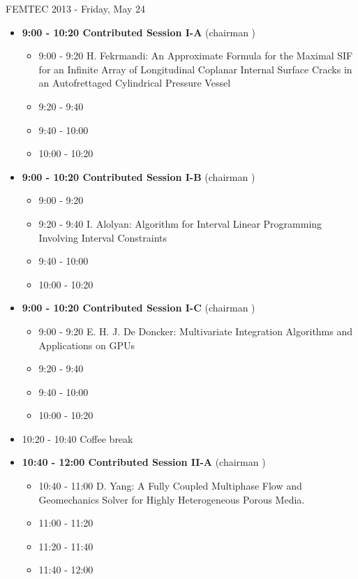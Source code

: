 \documentclass[10pt, A4]{article}%
\begin{document}
\centerline{\huge FEMTEC 2013 - Friday, May 24}
\vspace{4mm}
\begin{itemize}    
\item {\bf 9:00 - 10:20 Contributed Session I-A} (chairman ) 
  \begin{itemize}
    \item 9:00 - 9:20 {H. Fekrmandi}: {An Approximate Formula for the Maximal SIF for an Infinite Array of Longitudinal Coplanar Internal Surface Cracks in an Autofrettaged Cylindrical Pressure Vessel}
    \item 9:20 - 9:40 
    \item 9:40 - 10:00 
    \item 10:00 - 10:20  
  \end{itemize}
  \item {\bf 9:00 - 10:20 Contributed Session I-B} (chairman ) 
  \begin{itemize}
    \item 9:00 - 9:20 
    \item 9:20 - 9:40 {I. Alolyan}: {Algorithm for Interval Linear  Programming Involving Interval Constraints}
    \item 9:40 - 10:00 
    \item 10:00 - 10:20      
  \end{itemize}
    \item {\bf 9:00 - 10:20 Contributed Session I-C} (chairman ) 
  \begin{itemize}
    \item 9:00 - 9:20 {E. H. J. De Doncker}: {Multivariate Integration Algorithms and Applications on GPUs}
    \item 9:20 - 9:40 
    \item 9:40 - 10:00 
    \item 10:00 - 10:20      
  \end{itemize}
  \item 10:20 - 10:40 Coffee break
  \item {\bf 10:40 - 12:00 Contributed Session II-A} (chairman ) 
  \begin{itemize}
    \item 10:40 - 11:00 {D. Yang}: {A Fully Coupled Multiphase Flow and Geomechanics Solver for Highly Heterogeneous Porous Media.}
    \item 11:00 - 11:20 
    \item 11:20 - 11:40 
    \item 11:40 - 12:00 
  \end{itemize}

\end{itemize}
\end{document}
